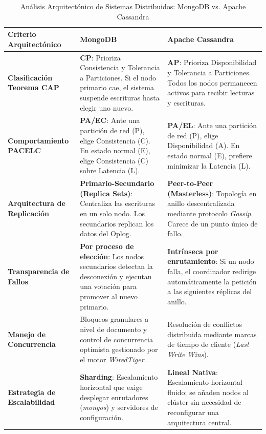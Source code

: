 \documentclass[12pt,a4paper]{article}
\begin{document}
\begin{table}[htbp]
\centering
\caption{Análisis Arquitectónico de Sistemas Distribuidos: MongoDB vs. Apache Cassandra}
\label{tab:comparativa_arquitectonica}
\renewcommand{\arraystretch}{1.4} %
\begin{tabular}{|p{3.5cm}|p{6.2cm}|p{6.2cm}|}
\hline
\rowcolor[HTML]{EFEFEF} %
\textbf{Criterio Arquitectónico} & \textbf{MongoDB} & \textbf{Apache Cassandra} \\ \hline

\textbf{Clasificación Teorema CAP} & 
\textbf{CP}: Prioriza Consistencia y Tolerancia a Particiones. Si el nodo primario cae, el sistema suspende escrituras hasta elegir uno nuevo. & 
\textbf{AP}: Prioriza Disponibilidad y Tolerancia a Particiones. Todos los nodos permanecen activos para recibir lecturas y escrituras. \\ \hline

\textbf{Comportamiento PACELC} & 
\textbf{PA/EC}: Ante una partición de red (P), elige Consistencia (C). En estado normal (E), elige Consistencia (C) sobre Latencia (L). & 
\textbf{PA/EL}: Ante una partición de red (P), elige Disponibilidad (A). En estado normal (E), prefiere minimizar la Latencia (L). \\ \hline

\textbf{Arquitectura de Replicación} & 
\textbf{Primario-Secundario (Replica Sets)}: Centraliza las escrituras en un solo nodo. Los secundarios replican los datos del Oplog. & 
\textbf{Peer-to-Peer (Masterless)}: Topología en anillo descentralizada mediante protocolo \textit{Gossip}. Carece de un punto único de fallo. \\ \hline

\textbf{Transparencia de Fallos} & 
\textbf{Por proceso de elección}: Los nodos secundarios detectan la desconexión y ejecutan una votación para promover al nuevo primario. & 
\textbf{Intrínseca por enrutamiento}: Si un nodo falla, el coordinador redirige automáticamente la petición a las siguientes réplicas del anillo. \\ \hline

\textbf{Manejo de Concurrencia} & 
Bloqueos granulares a nivel de documento y control de concurrencia optimista gestionado por el motor \textit{WiredTiger}. & 
Resolución de conflictos distribuida mediante marcas de tiempo de cliente (\textit{Last Write Wins}). \\ \hline

\textbf{Estrategia de Escalabilidad} & 
\textbf{Sharding}: Escalamiento horizontal que exige desplegar enrutadores (\textit{mongos}) y servidores de configuración. & 
\textbf{Lineal Nativa}: Escalamiento horizontal fluido; se añaden nodos al clúster sin necesidad de reconfigurar una arquitectura central. \\ \hline

\end{tabular}
\end{table}
\end{document}
